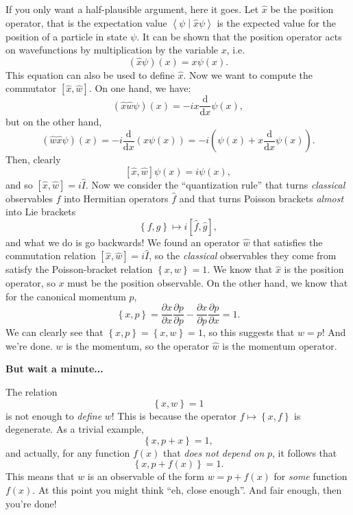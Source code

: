 \documentclass[11pt,a4]{article}
\newcommand{\braket}[2]{\left\langle #1 \middle\vert #2\right\rangle}
\newcommand{\commut}[1]{\left[#1\right]}
\newcommand{\de}{\mathrm{d}}
\newcommand{\tdev}[2]{\frac{\de #1}{\de #2}}
\newcommand{\pdev}[2]{\frac{\partial #1}{\partial #2}}
\newcommand{\set}[1]{\left\{#1\right\}}
\begin{document}
If you only want a half-plausible argument, here it goes. Let $\hat{x}$ be the position operator, that is
the expectation value $\braket{\psi}{\hat{x}\psi}$ is the expected value for the position of a particle in
state $\psi$. It can be shown that the position operator acts on wavefunctions by multiplication by the variable
$x$, i.e.
\begin{equation}
  (\hat{x}\psi)(x)=x\psi(x).
\end{equation}
This equation can also be used to define $\hat{x}$. Now we want to compute the commutator $\commut{\hat{x},\hat{w}}$.
On one hand, we have:
\begin{equation}
  (\hat{x}\hat{w}\psi)(x) = -ix\tdev{}{x}\psi(x),
\end{equation}
but on the other hand,
\begin{equation}
  (\hat{w}\hat{x}\psi)(x) = -i\tdev{}{x}\left(x\psi(x)\right) = -i\left(\psi(x) + x\tdev{}{x}\psi(x)\right).
\end{equation}
Then, clearly
\begin{equation}
  \commut{\hat{x},\hat{w}}\psi(x) = i\psi(x),
\end{equation}
and so $\commut{\hat{x},\hat{w}}=i\hat{I}$. Now we consider the ``quantization rule'' that
turns \emph{classical} observables $f$ into Hermitian operators $\hat{f}$ and that turns Poisson brackets
\emph{almost} into Lie brackets 
\begin{equation}
  \set{f,g} \mapsto i\commut{\hat{f},\hat{g}},
\end{equation}
and what we do is go backwards! We found an operator $\hat{w}$ that satisfies the commutation relation
$\commut{\hat{x},\hat{w}}=i\hat{I}$, so the \emph{classical} observables they come from satisfy the Poisson-bracket
relation $\set{x,w}=1$. We know that $\hat{x}$ is the position operator, so $x$ must be the position observable. On the other
hand, we know that for the canonical momentum $p$,
\begin{equation}
  \set{x,p} = \pdev{x}{x} \pdev{p}{p}-\pdev{x}{p} \pdev{p}{x} = 1.
\end{equation}
We can clearly see that $\set{x,p}=\set{x,w}=1$, so this suggests that $w=p$! And we're done. $w$ is the momentum, so the operator
$\hat{w}$ is the momentum operator.

\textbf{But wait a minute...}

The relation
\begin{equation}
  \set{x,w} = 1
\end{equation}
is not enough to \emph{define} $w$! This is because the operator $f\mapsto\set{x,f}$ is degenerate. As a trivial example,
\begin{equation}
  \set{x,p+x} = 1,
\end{equation}
and actually, for any function $f(x)$ that \emph{does not depend on }$p$, it follows that
\begin{equation}
  \set{x,p+f(x)}=1.
\end{equation}
This means that $w$ is an observable of the form $ w = p + f(x)$ for \emph{some} function $f(x)$.
At this point you might think ``eh, close enough''. And fair enough, then you're done!
\end{document}

